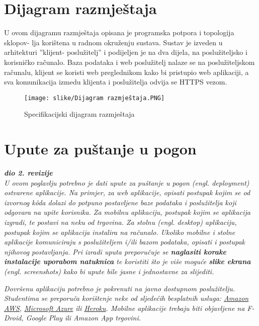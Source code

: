 			\eject 
		
		 
		\section{Dijagram razmještaja}
		
		U ovom dijagramu razmještaja opisana je programska potpora i topologija sklopov-
		lja korištena u radnom okruženju sustava. Sustav je izveden u arhitekturi ”klijent-
		poslužitelj” i podijeljen je na dva dijela, na poslužiteljsko i korisničko računalo.
		Baza podataka i web poslužitelj nalaze se na poslužiteljskom računalu, klijent se
		koristi web preglednikom kako bi pristupio web aplikaciji, a sva komunikacija
		izmedu klijenta i poslužitelja odvija se HTTPS vezom.
			
		\begin{figure}[H]
			\texttt{[image: slike/Dijagram razmještaja.PNG]} %
			\centering
			\caption{Specifikacijski dijagram razmještaja}
			\label{fig:promjene}
		\end{figure}
		
		\section{Upute za puštanje u pogon}
		
			\textbf{\textit{dio 2. revizije}}\\
		
			 \textit{U ovom poglavlju potrebno je dati upute za puštanje u pogon (engl. deployment) ostvarene aplikacije. Na primjer, za web aplikacije, opisati postupak kojim se od izvornog kôda dolazi do potpuno postavljene baze podataka i poslužitelja koji odgovara na upite korisnika. Za mobilnu aplikaciju, postupak kojim se aplikacija izgradi, te postavi na neku od trgovina. Za stolnu (engl. desktop) aplikaciju, postupak kojim se aplikacija instalira na računalo. Ukoliko mobilne i stolne aplikacije komuniciraju s poslužiteljem i/ili bazom podataka, opisati i postupak njihovog postavljanja. Pri izradi uputa preporučuje se \textbf{naglasiti korake instalacije uporabom natuknica} te koristiti što je više moguće \textbf{slike ekrana} (engl. screenshots) kako bi upute bile jasne i jednostavne za slijediti.}
			
			
			 \textit{Dovršenu aplikaciju potrebno je pokrenuti na javno dostupnom poslužitelju. Studentima se preporuča korištenje neke od sljedećih besplatnih usluga: \href{https://aws.amazon.com/}{Amazon AWS}, \href{https://azure.microsoft.com/en-us/}{Microsoft Azure} ili \href{https://www.heroku.com/}{Heroku}. Mobilne aplikacije trebaju biti objavljene na F-Droid, Google Play ili Amazon App trgovini.}
			
			
			\eject 